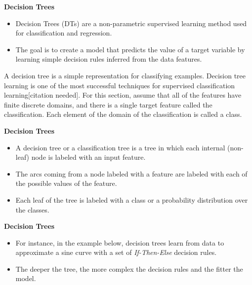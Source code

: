 \documentclass[MASTER.tex]{subfiles}
\begin{document}
 

\begin{frame}
	\LARGE
\textbf{Decision Trees}
\begin{itemize}
	\item  Decision Trees (DTs) are a non-parametric supervised learning method used for classification and regression. \item The goal is to create a model that predicts the value of a target variable by learning simple decision rules inferred from the data features.
\end{itemize}
\end{frame}

\begin{frame}
	A decision tree is a simple representation for classifying examples. Decision tree learning is one of the most successful techniques for supervised classification learning[citation needed]. For this section, assume that all of the features have finite discrete domains, and there is a single target feature called the classification. Each element of the domain of the classification is called a class. 
\end{frame}
\begin{frame}
	\LARGE
	\textbf{Decision Trees}
	\begin{itemize}
		\item A decision tree or a classification tree is a tree in which each internal (non-leaf) node is labeled with an input feature. 
		\item The arcs coming from a node labeled with a feature are labeled with each of the possible values of the feature.
		\item Each leaf of the tree is labeled with a class or a probability distribution over the classes.

\end{itemize}
\end{frame}
\begin{frame}
	\LARGE
\textbf{Decision Trees}
\begin{itemize}
\item For instance, in the example below, decision trees learn from data to approximate a sine curve with a set of \textit{If-Then-Else} decision rules. 
\item The deeper the tree, the more complex the decision rules and the fitter the model.
\end{itemize}

\end{frame}
\end{document}
